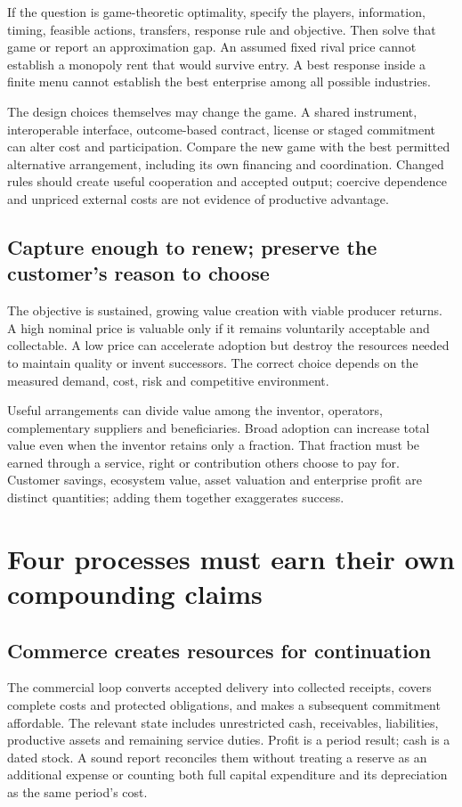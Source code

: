 \documentclass[11pt,letterpaper]{article}
\begin{document}
If the question is game-theoretic optimality, specify the players, information, timing, feasible actions, transfers, response rule and objective. Then solve that game or report an approximation gap. An assumed fixed rival price cannot establish a monopoly rent that would survive entry. A best response inside a finite menu cannot establish the best enterprise among all possible industries.

The design choices themselves may change the game. A shared instrument, interoperable interface, outcome-based contract, license or staged commitment can alter cost and participation. Compare the new game with the best permitted alternative arrangement, including its own financing and coordination. Changed rules should create useful cooperation and accepted output; coercive dependence and unpriced external costs are not evidence of productive advantage.

\subsection{Capture enough to renew; preserve the customer's reason to choose}
The objective is sustained, growing value creation with viable producer returns. A high nominal price is valuable only if it remains voluntarily acceptable and collectable. A low price can accelerate adoption but destroy the resources needed to maintain quality or invent successors. The correct choice depends on the measured demand, cost, risk and competitive environment.

Useful arrangements can divide value among the inventor, operators, complementary suppliers and beneficiaries. Broad adoption can increase total value even when the inventor retains only a fraction. That fraction must be earned through a service, right or contribution others choose to pay for. Customer savings, ecosystem value, asset valuation and enterprise profit are distinct quantities; adding them together exaggerates success.

\section{Four processes must earn their own compounding claims}
\subsection{Commerce creates resources for continuation}
The commercial loop converts accepted delivery into collected receipts, covers complete costs and protected obligations, and makes a subsequent commitment affordable. The relevant state includes unrestricted cash, receivables, liabilities, productive assets and remaining service duties. Profit is a period result; cash is a dated stock. A sound report reconciles them without treating a reserve as an additional expense or counting both full capital expenditure and its depreciation as the same period's cost.
\end{document}
